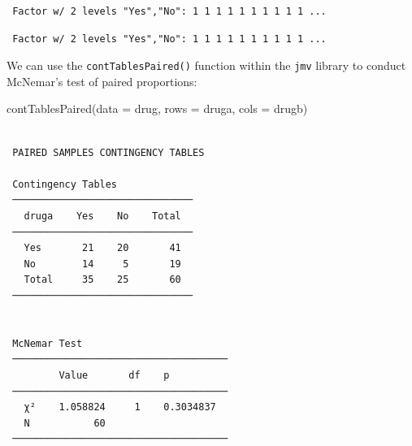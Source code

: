 \documentclass[
  a4paper,
]{memoir}
\newenvironment{Shaded}{\begin{snugshade}}{\end{snugshade}}
\newcommand{\AttributeTok}[1]{\textcolor[rgb]{0.00,0.00,0.00}{#1}}
\newcommand{\FunctionTok}[1]{\textcolor[rgb]{0.00,0.00,0.00}{#1}}
\newcommand{\NormalTok}[1]{\textcolor[rgb]{0.00,0.00,0.00}{#1}}
\newcommand{\OtherTok}[1]{\textcolor[rgb]{0.00,0.00,0.00}{#1}}
\newcommand{\SpecialCharTok}[1]{\textcolor[rgb]{0.00,0.00,0.00}{#1}}
\newcommand{\StringTok}[1]{\textcolor[rgb]{0.00,0.00,0.00}{#1}}
\begin{document}
\begin{Shaded}
\end{Shaded}

\begin{verbatim}
 Factor w/ 2 levels "Yes","No": 1 1 1 1 1 1 1 1 1 1 ...
\end{verbatim}

\begin{Shaded}
\end{Shaded}

\begin{verbatim}
 Factor w/ 2 levels "Yes","No": 1 1 1 1 1 1 1 1 1 1 ...
\end{verbatim}

We can use the \texttt{contTablesPaired()} function within the
\texttt{jmv} library to conduct McNemar's test of paired proportions:

\begin{Shaded}
\begin{Highlighting}[]
\FunctionTok{contTablesPaired}\NormalTok{(}\AttributeTok{data =}\NormalTok{ drug, }\AttributeTok{rows =}\NormalTok{ druga, }\AttributeTok{cols =}\NormalTok{ drugb)}
\end{Highlighting}
\end{Shaded}

\begin{verbatim}

 PAIRED SAMPLES CONTINGENCY TABLES

 Contingency Tables              
 ─────────────────────────────── 
   druga    Yes    No    Total   
 ─────────────────────────────── 
   Yes       21    20       41   
   No        14     5       19   
   Total     35    25       60   
 ─────────────────────────────── 


 McNemar Test                          
 ───────────────────────────────────── 
         Value       df    p           
 ───────────────────────────────────── 
   χ²    1.058824     1    0.3034837   
   N           60                      
 ───────────────────────────────────── 
\end{verbatim}
\end{document}
